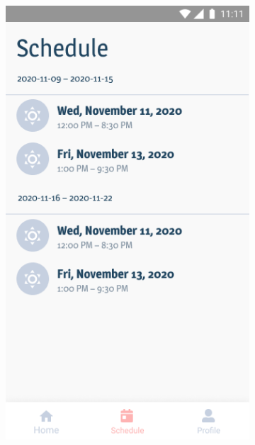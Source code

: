 \documentclass[twoside]{ctuthesis}
\begin{document}
\begin{figure}[h]
	\centering
	\begin{subfigure}{.5\textwidth}
		\centering
		\includegraphics[width=.9\linewidth]{img/v1-main-home-schedule.png}
		\label{fig:main-schedule}
	\end{subfigure}%
	\begin{subfigure}[h!]{.5\textwidth}
		\centering

\end{subfigure}
\end{figure}
\end{document}
